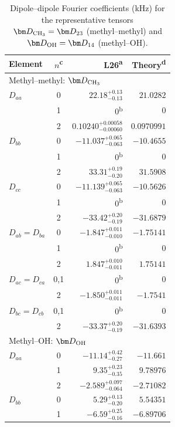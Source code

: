 \begin{table}
\begingroup
\caption{Dipole--dipole Fourier coefficients (kHz) for the
representative tensors $\bm D_{\rm CH_3}=\bm D_{23}$ (methyl--methyl) and $\bm D_{\rm OH}=\bm D_{14}$ (methyl--OH).}\label{tab:fit-dd}
\centering
\begingroup
\small
\setlength{\tabcolsep}{3.5pt}
\renewcommand{\arraystretch}{1.0}
\begin{tabular}{@{}lcrr@{}}
\toprule
Element & $n$\textsuperscript{c} & L26\textsuperscript{a} & Theory\textsuperscript{d}\\
\midrule
\multicolumn{4}{l}{Methyl--methyl: $\bm D_{\rm CH_3}$}\\
$D_{aa}$ & 0 & ${22.18}_{-0.13}^{+0.13}$ & $21.0282$\\
 & 1 & $0$\textsuperscript{b} & $0$\\
 & 2 & ${0.10240}_{-0.00060}^{+0.00058}$ & $0.0970991$\\
$D_{bb}$ & 0 & ${-11.037}_{-0.063}^{+0.065}$ & $-10.4655$\\
 & 1 & $0$\textsuperscript{b} & $0$\\
 & 2 & ${33.31}_{-0.20}^{+0.19}$ & $31.5908$\\
$D_{cc}$ & 0 & ${-11.139}_{-0.063}^{+0.065}$ & $-10.5626$\\
 & 1 & $0$\textsuperscript{b} & $0$\\
 & 2 & ${-33.42}_{-0.19}^{+0.20}$ & $-31.6879$\\
$D_{ab}=D_{ba}$ & 0 & ${-1.847}_{-0.010}^{+0.011}$ & $-1.75141$\\
 & 1 & $0$\textsuperscript{b} & $0$\\
 & 2 & ${1.847}_{-0.011}^{+0.010}$ & $1.75141$\\
$D_{ac}=D_{ca}$ & 0,1 & $0$\textsuperscript{b} & $0$\\
 & 2 & ${-1.850}_{-0.011}^{+0.011}$ & $-1.7541$\\
$D_{bc}=D_{cb}$ & 0,1 & $0$\textsuperscript{b} & $0$\\
 & 2 & ${-33.37}_{-0.19}^{+0.20}$ & $-31.6393$\\
\midrule
\multicolumn{4}{l}{Methyl--OH: $\bm D_{\rm OH}$}\\
$D_{aa}$ & 0 & ${-11.14}_{-0.27}^{+0.42}$ & $-11.661$\\
 & 1 & ${9.35}_{-0.35}^{+0.23}$ & $9.78976$\\
 & 2 & ${-2.589}_{-0.064}^{+0.097}$ & $-2.71082$\\
$D_{bb}$ & 0 & ${5.29}_{-0.20}^{+0.13}$ & $5.54351$\\
 & 1 & ${-6.59}_{-0.16}^{+0.25}$ & $-6.89706$\\

\end{tabular}
\end{table}
